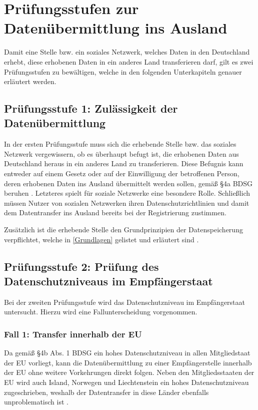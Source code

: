 \section{Prüfungsstufen zur Datenübermittlung ins Ausland}
Damit eine Stelle bzw. ein soziales Netzwerk, welches Daten in den Deutschland erhebt, diese erhobenen Daten in ein anderes Land transferieren darf, gilt es zwei Prüfungsstufen zu bewältigen, welche in den folgenden Unterkapiteln genauer erläutert werden.

\subsection{Prüfungsstufe 1: Zulässigkeit der Datenübermittlung}
In der ersten Prüfungsstufe muss sich die erhebende Stelle bzw. das soziales Netzwerk vergewissern, ob es überhaupt befugt ist, die erhobenen Daten aus Deutschland heraus in ein anderes Land zu transferieren. Diese Befugnis kann entweder auf einem Gesetz oder auf der Einwilligung der betroffenen Person, deren erhobenen Daten ins Ausland übermittelt werden sollen, gemäß §4a BDSG beruhen \autocite[vgl.][]{LDI.2017}. Letzteres spielt für soziale Netzwerke eine besondere Rolle. Schließlich müssen Nutzer von sozialen Netzwerken ihren Datenschutzrichtlinien und damit dem Datentransfer ins Ausland bereits bei der Registrierung zustimmen.
\par
Zusätzlich ist die erhebende Stelle den Grundprinzipien der Datenspeicherung verpflichtet, welche in \vref{Grundlagen} gelistet und erläutert sind \autocite[vgl.][]{LDI.2017}.

\subsection{Prüfungsstufe 2: Prüfung des Datenschutzniveaus im Empfängerstaat}
Bei der zweiten Prüfungsstufe wird das Datenschutzniveau im Empfängerstaat untersucht. Hierzu wird eine Fallunterscheidung vorgenommen.

\subsubsection{Fall 1: Transfer innerhalb der EU}
Da gemäß §4b Abs. 1 BDSG ein hohes Datenschutzniveau in allen Mitgliedstaat der \acl{EU} vorliegt, kann die Datenübermittlung zu einer Empfängerstelle innerhalb der \acl{EU} ohne weitere Vorkehrungen direkt folgen. Neben den Mitgliedsstaaten der \ac{EU} wird auch Island, Norwegen und Liechtenstein ein hohes Datenschutzniveau zugeschrieben, weshalb der Datentransfer in diese Länder ebenfalls unproblematisch ist \autocite[vgl.][]{LDI.2017}.

